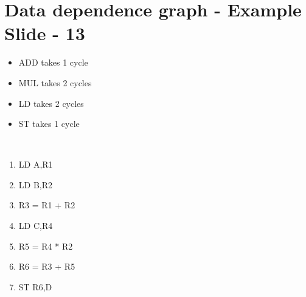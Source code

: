 \documentclass{report}
\begin{document}
\newpage
\section{Data dependence graph - Example Slide - 13}
\vspace{-1em}
\begin{multicols}{2}
  \begin{itemize}
    \item ADD takes 1 cycle
    \item MUL takes 2 cycles
    \item LD takes 2 cycles
    \item ST takes 1 cycle
  \end{itemize} \
  \begin{enumerate}
    \item LD A,R1
    \item LD B,R2
    \item R3 = R1 + R2
    \item LD C,R4
    \item R5 = R4 * R2
    \item R6 = R3 + R5
    \item ST R6,D
  \end{enumerate}


\end{multicols}
\end{document}

